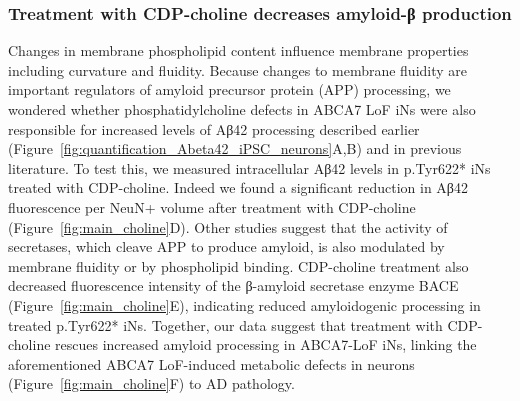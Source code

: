 \subsubsection{Treatment with CDP-choline decreases amyloid-β production}
Changes in membrane phospholipid content influence membrane properties including curvature and fluidity\cite{Van_der_Veen2017-pj}. Because changes to membrane fluidity are important regulators of amyloid precursor protein (APP) processing\cite{Bharadwaj2018-yu,Yang2014-vl}, we wondered whether phosphatidylcholine defects in ABCA7 LoF iNs were also responsible for increased levels of Aβ42 processing described earlier (Figure~\ref{fig:quantification_Abeta42_iPSC_neurons}A,B) and in previous literature\cite{Satoh2015-yu,Sakae2016-uy,Chan2008-qu,Bamji-Mirza2018-xt}. To test this, we measured intracellular Aβ42 levels in p.Tyr622* iNs treated with CDP-choline. Indeed we found a significant reduction in Aβ42 fluorescence per NeuN+ volume after treatment with CDP-choline (Figure~\ref{fig:main_choline}D). Other studies suggest that the activity of secretases, which cleave APP to produce amyloid, is also modulated by membrane fluidity or by phospholipid binding\cite{Walter2013-qu,Takasugi2011-iq,Kalvodova2005-kb}. CDP-choline treatment also decreased fluorescence intensity of the β-amyloid secretase enzyme BACE (Figure~\ref{fig:main_choline}E), indicating reduced amyloidogenic processing in treated p.Tyr622* iNs. Together, our data suggest that treatment with CDP-choline rescues increased amyloid processing in ABCA7-LoF iNs, linking the aforementioned ABCA7 LoF-induced metabolic defects in neurons (Figure~\ref{fig:main_choline}F) to AD pathology.  

